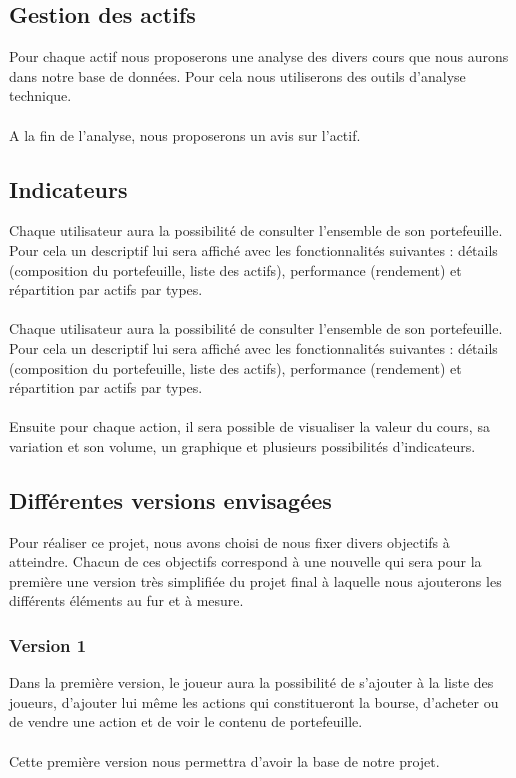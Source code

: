 \subsection{Gestion des actifs}
Pour chaque actif nous proposerons une analyse des divers cours que nous aurons dans notre base de données. Pour cela nous utiliserons des outils d’analyse technique. \\ \\
A la fin de l’analyse, nous proposerons un avis sur l’actif. 

\subsection{Indicateurs}
Chaque utilisateur aura la possibilité de consulter l’ensemble de son portefeuille. Pour cela un descriptif lui sera affiché avec les fonctionnalités suivantes : détails (composition du portefeuille, liste des actifs), performance (rendement) et répartition par actifs par types. \\ \\
Chaque utilisateur aura la possibilité de consulter l’ensemble de son portefeuille. Pour cela un descriptif lui sera affiché avec les fonctionnalités suivantes : détails (composition du portefeuille, liste des actifs), performance (rendement) et répartition par actifs par types. \\ \\
Ensuite pour chaque action, il sera possible de visualiser la valeur du cours, sa variation et son volume, un graphique et plusieurs possibilités d’indicateurs. 


\subsection{Différentes versions envisagées}
Pour réaliser ce projet, nous avons choisi de nous fixer divers objectifs à atteindre. Chacun de ces objectifs correspond à une nouvelle qui sera pour la première une version très simplifiée du projet final à laquelle nous ajouterons les différents éléments au fur et à mesure.
\subsubsection{Version 1}
Dans la première version, le joueur aura la possibilité de s'ajouter à la liste des joueurs, d'ajouter lui même les actions qui constitueront la bourse, d'acheter ou de vendre une action et de voir le contenu de portefeuille. \\ \\
Cette première version nous permettra d'avoir la base de notre projet. 

